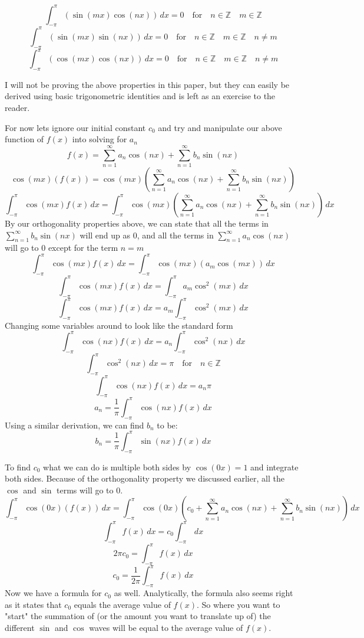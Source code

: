 \documentclass{report}
\begin{document}
\[ \int_{-\pi}^{\pi} (\sin(mx) \cos(nx)) \, dx = 0 \quad \textrm{for} \quad n \in \mathbb{Z} \quad m \in \mathbb{Z}  \]
\[ \int_{-\pi}^{\pi} (\sin(mx) \sin(nx)) \, dx = 0 \quad \textrm{for} \quad n \in \mathbb{Z} \quad m \in \mathbb{Z} \quad n \neq m  \]
\[ \int_{-\pi}^{\pi} (\cos(mx) \cos(nx)) \, dx = 0 \quad \textrm{for} \quad n \in \mathbb{Z} \quad m \in \mathbb{Z} \quad n \neq m  \]

I will not be proving the above properties in this paper, but they can easily be derived using basic trigonometric identities and is left as an exercise to the reader. 

For now lets ignore our initial constant $c_0$ and try and manipulate our above function of $f(x)$ into solving for $a_n$ 
\[ f(x)= \sum_{n=1}^{\infty} a_n\cos(nx) + \sum_{n=1}^{\infty} b_n\sin(nx) \]
\[ \cos(mx)(f(x))= \cos(mx) \left( \sum_{n=1}^{\infty} a_n\cos(nx) + \sum_{n=1}^{\infty} b_n\sin(nx) \right) \]
\[ \int_{-\pi}^{\pi} \cos(mx)f(x) \, dx = \int_{-\pi}^{\pi} \cos(mx) \left( \sum_{n=1}^{\infty} a_n\cos(nx) + \sum_{n=1}^{\infty} b_n\sin(nx) \right) \, dx \]
By our orthogonality properties above, we can state that all the terms in $\sum_{n=1}^{\infty} b_n\sin(nx)$ will end up as 0,
and all the terms in $\sum_{n=1}^{\infty} a_n\cos(nx)$ will go to 0 except for the term $n = m$
\[ \int_{-\pi}^{\pi} \cos(mx)f(x) \, dx = \int_{-\pi}^{\pi} \cos(mx) (a_m\cos(mx)) \, dx \]
\[ \int_{-\pi}^{\pi} \cos(mx)f(x) \, dx = \int_{-\pi}^{\pi} a_m \cos^2(mx) \, dx \]
\[ \int_{-\pi}^{\pi} \cos(mx)f(x) \, dx = a_m \int_{-\pi}^{\pi} \cos^2(mx) \, dx \]
Changing some variables around to look like the standard form
\[ \int_{-\pi}^{\pi} \cos(nx)f(x) \, dx = a_n \int_{-\pi}^{\pi} \cos^2(nx) \, dx \]
\[ \int_{-\pi}^{\pi} \cos^2(nx) \, dx = \pi \quad  \textrm{for} \quad n \in \mathbb{Z} \]
\[ \int_{-\pi}^{\pi} \cos(nx)f(x) \, dx = a_n \pi \]
\[ a_n = \frac{1}{\pi} \int_{-\pi}^{\pi} \cos(nx)f(x) \, dx \]
Using a similar derivation, we can find $b_n$ to be:
\[ b_n = \frac{1}{\pi} \int_{-\pi}^{\pi} \sin(nx)f(x) \, dx \]

To find $c_0$ what we can do is multiple both sides by $\cos(0x) = 1$ and integrate both sides.
Because of the orthogonality property we discussed earlier, all the $\cos$ and $\sin$ terms will go to 0.
\[ \int_{-\pi}^{\pi} \cos(0x)(f(x)) \, dx = 
\int_{-\pi}^{\pi} \cos(0x) \left( c_0 + \sum_{n=1}^{\infty} a_n\cos(nx) + \sum_{n=1}^{\infty} b_n\sin(nx) \right) \, dx \]
\[\int_{-\pi}^{\pi} f(x) \, dx = c_0 \int_{-\pi}^{\pi} \, dx\]
\[ 2\pi c_0 = \int_{-\pi}^{\pi} f(x) \, dx \]
\[ c_0 = \frac{1}{2\pi}\int_{-\pi}^{\pi} f(x) \, dx \]
Now we have a formula for $c_0$ as well. Analytically, the formula also seems right as it states that $c_0$ equals
the average value of $f(x)$. So where you want to "start" the summation of (or the amount you want to translate up of)
the different $\sin$ and $\cos$ waves will be equal to the average value of $f(x)$.
\end{document}
